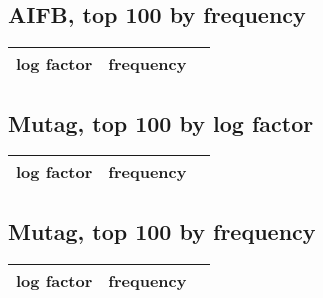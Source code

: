 \documentclass[letterpaper]{article} %
\begin{document}
\subsection{AIFB, top 100 by frequency}

\begin{longtable}{ r r p{10cm} }
 log factor & frequency & \\
\hline\endhead
 
\hline
\end{longtable}

\subsection{Mutag, top 100 by log factor}

\begin{longtable}{ r r p{10cm} }
 log factor & frequency & \\
\hline\endhead

\hline
\end{longtable}

\subsection{Mutag, top 100 by frequency}


\begin{longtable}{ r r p{10cm} }
 log factor & frequency & \\
\hline\endhead
  
\hline
\end{longtable}
\end{document}

